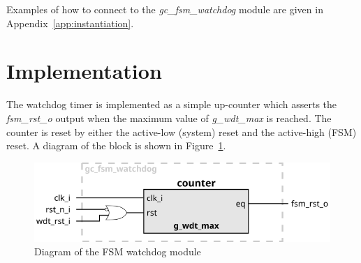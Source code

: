 \documentclass[a4paper,11pt]{article}
\begin{document}
Examples of how to connect to the \textit{gc\_fsm\_watchdog} module are given in
Appendix~\ref{app:instantiation}.

\section{Implementation}
\label{sec:implem}

The watchdog timer is implemented as a simple up-counter which asserts the
\textit{fsm\_rst\_o} output when the maximum value of \textit{g\_wdt\_max} is
reached. The counter is reset by either the active-low (system) reset and the
active-high (FSM) reset. A diagram of the block is shown in Figure~\ref{fig:implem}.

\begin{figure}[h]
  \centerline{\includegraphics[width=\textwidth]{fig/implem}}
  \caption{Diagram of the FSM watchdog module}
  \label{fig:implem}
\end{figure}
\end{document}
